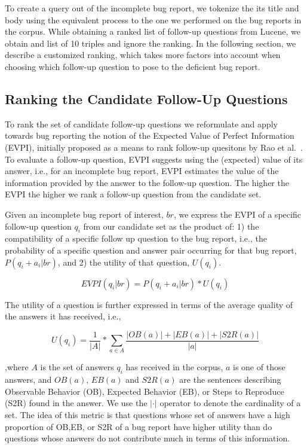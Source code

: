 To create a query out of the incomplete bug report, we tokenize the its title and body
using the equivalent process to the one we performed on the bug reports in the corpus.
While obtaining a ranked list of follow-up questions from Lucene, we obtain and list of 10
triples and ignore the ranking. In the following section, we describe a customized ranking, which
takes more factors into account when choosing which follow-up question to pose to the deficient
bug report.


\subsection{Ranking the Candidate Follow-Up Questions}\label{sec:ranking}

To rank the set of candidate follow-up questions we reformulate and apply towards bug reporting
the notion of the Expected Value of Perfect Information (EVPI), initially proposed as a means to
rank follow-up quesitons by Rao et al.~\cite{rao-daume-iii-2018-learning}. To evaluate a follow-up question, EVPI suggests
using the (expected) value of its answer, i.e., for an
incomplete bug report, EVPI estimates the value of the information provided by the answer to the
follow-up question. The higher the EVPI the higher we rank a follow-up question from the candidate
set.

Given an incomplete bug report of interest, $br$, we express the EVPI of a specific follow-up question $q_{i}$ from our candidate set
as the product of: 1) the compatibility of a specific follow up question to the bug report, i.e.,
the probability of a specific question and answer pair occurring for that bug report, $P(q_{i}+a_{i}|br)$, and 2) the utility of that question, $U(q_{i})$.

$$EVPI(q_{i}|br) = P(q_{i}+a_{i}|br) * U(q_{i})$$

The utility of a question is further expressed in terms of the average quality of the answers it has received, i.e.,

$$U(q_{i}) = \frac{1}{|A|} * \sum_{a \in A}^{} \frac{|OB(a)|+|EB(a)|+|S2R(a)|}{|a|}$$

\noindent
,where $A$ is the set of answers $q_{i}$ has received in the corpus, $a$ is one of those answers, and
$OB(a)$, $EB(a)$ and $S2R(a)$ are the sentences describing Observable Behavior (OB), Expected Behavior (EB), or
Steps to Reproduce (S2R) found in the answer. We use the $|\cdot|$ operator to denote the cardinality of a set.
The idea of this metric is that questions whose set of answers have a high proportion
of OB,EB, or S2R of a bug report have higher utility than do questions whose answers do not contribute much in
terms of this information.

